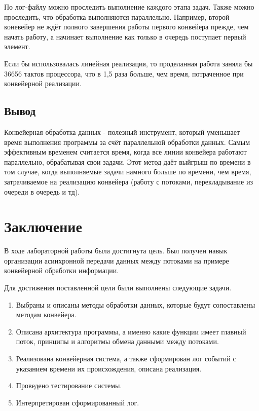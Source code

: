 \documentclass[12pt]{report}
\begin{document}
По лог-файлу можно проследить выполнение каждого этапа  задач. Также можно проследить, что обработка выполняются параллельно. Например, второй коневейер не ждёт полного завершения работы первого конвейера прежде, чем начать работу, а начинает выполнение как только в очередь поступает первый элемент.

Если бы использовалась линейная реализация, то проделанная работа заняла бы 36656 тактов процессора, что в 1,5 раза больше, чем время, потраченное при конвейерной реализации.
\newpage

\section{Вывод}
Конвейерная обработка данных - полезный инструмент, который уменьшает время выполнения программы за счёт параллельной обработки данных. Самым эффективным временем считается время, когда все линии конвейера работают параллельно, обрабатывая свои задачи. Этот метод даёт выйгрыш по времени в том случае, когда выполняемые задачи намного больше по времени, чем время, затрачиваемое на реализацию конвейера (работу с потоками, перекладывание из очереди в очередь и тд).



\chapter*{Заключение}

В ходе лабораторной работы была достигнута цель. Был получен навык организации асинхронной передачи данных между потоками на примере конвейерной обработки информации.

Для достижения поставленной цели были выполнены следующие задачи.
\begin{enumerate}
	\item Выбраны и описаны методы обработки данных, которые будут сопоставлены методам конвейера.
	
	\item Описана архитектура программы, а именно какие функции имеет главный поток, принципы и алгоритмы обмена данными между потоками.
	
	\item Реализована конвейерная система, а также сформирован лог событий с указанием времени их происхождения, описана реализация.
	
	\item Проведено тестирование системы.
	
	\item Интерпретирован сформированный лог.
	
\end{enumerate}
\end{document}
